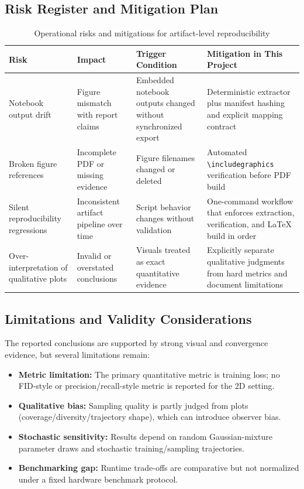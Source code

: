 \documentclass[journal]{IEEEtran}
\begin{document}
\subsection{Risk Register and Mitigation Plan}

\begin{table}[t]
\centering
\small
\setlength{\tabcolsep}{4pt}
\begin{tabular}{p{}p{}p{}p{}}
\toprule
Risk & Impact & Trigger Condition & Mitigation in This Project \\
\midrule
Notebook output drift & Figure mismatch with report claims & Embedded notebook outputs changed without synchronized export & Deterministic extractor plus manifest hashing and explicit mapping contract \\
\midrule
Broken figure references & Incomplete PDF or missing evidence & Figure filenames changed or deleted & Automated \texttt{\textbackslash includegraphics} verification before PDF build \\
\midrule
Silent reproducibility regressions & Inconsistent artifact pipeline over time & Script behavior changes without validation & One-command workflow that enforces extraction, verification, and LaTeX build in order \\
\midrule
Over-interpretation of qualitative plots & Invalid or overstated conclusions & Visuals treated as exact quantitative evidence & Explicitly separate qualitative judgments from hard metrics and document limitations \\
\bottomrule
\end{tabular}
\normalsize
\caption{Operational risks and mitigations for artifact-level reproducibility}
\label{tab:risk_register}
\end{table}

\subsection{Limitations and Validity Considerations}

The reported conclusions are supported by strong visual and convergence evidence, but several limitations remain:
\begin{itemize}
    \item \textbf{Metric limitation:} The primary quantitative metric is training loss; no FID-style or precision/recall-style metric is reported for the 2D setting.
    \item \textbf{Qualitative bias:} Sampling quality is partly judged from plots (coverage/diversity/trajectory shape), which can introduce observer bias.
    \item \textbf{Stochastic sensitivity:} Results depend on random Gaussian-mixture parameter draws and stochastic training/sampling trajectories.
    \item \textbf{Benchmarking gap:} Runtime trade-offs are comparative but not normalized under a fixed hardware benchmark protocol.
\end{itemize}
\end{document}

